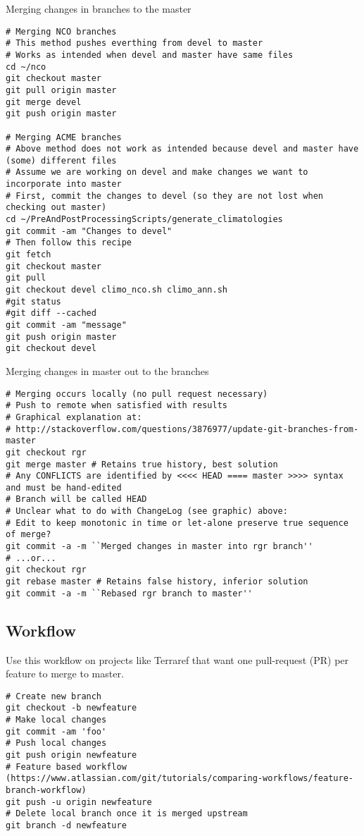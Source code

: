 \documentclass[12pt,twoside]{article}
\begin{document}
Merging changes in branches to the master
\begin{verbatim}
# Merging NCO branches
# This method pushes everthing from devel to master
# Works as intended when devel and master have same files
cd ~/nco
git checkout master
git pull origin master
git merge devel
git push origin master

# Merging ACME branches
# Above method does not work as intended because devel and master have (some) different files
# Assume we are working on devel and make changes we want to incorporate into master
# First, commit the changes to devel (so they are not lost when checking out master)
cd ~/PreAndPostProcessingScripts/generate_climatologies
git commit -am "Changes to devel"
# Then follow this recipe
git fetch
git checkout master
git pull
git checkout devel climo_nco.sh climo_ann.sh
#git status
#git diff --cached
git commit -am "message"
git push origin master
git checkout devel
\end{verbatim}

Merging changes in master out to the branches
\begin{verbatim}
# Merging occurs locally (no pull request necessary)
# Push to remote when satisfied with results
# Graphical explanation at:
# http://stackoverflow.com/questions/3876977/update-git-branches-from-master
git checkout rgr
git merge master # Retains true history, best solution
# Any CONFLICTS are identified by <<<< HEAD ==== master >>>> syntax and must be hand-edited
# Branch will be called HEAD
# Unclear what to do with ChangeLog (see graphic) above:
# Edit to keep monotonic in time or let-alone preserve true sequence of merge?
git commit -a -m ``Merged changes in master into rgr branch''
# ...or...
git checkout rgr
git rebase master # Retains false history, inferior solution
git commit -a -m ``Rebased rgr branch to master''
\end{verbatim}

\subsection{Workflow}\label{sxn:git_wrk}
Use this workflow on projects like Terraref that want one pull-request
(PR) per feature to merge to master. 
\begin{verbatim}
# Create new branch
git checkout -b newfeature
# Make local changes
git commit -am 'foo'
# Push local changes
git push origin newfeature
# Feature based workflow (https://www.atlassian.com/git/tutorials/comparing-workflows/feature-branch-workflow)
git push -u origin newfeature
# Delete local branch once it is merged upstream
git branch -d newfeature
\end{verbatim}
\end{document}
